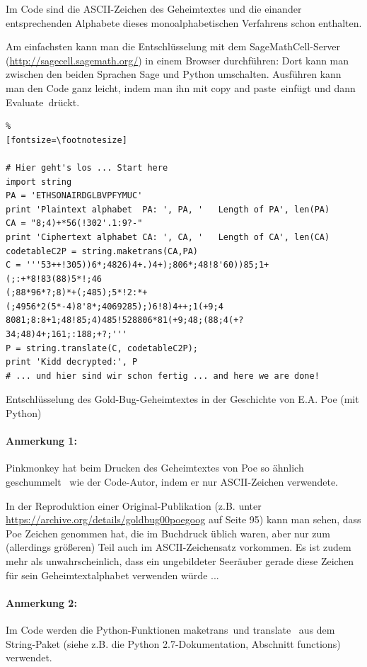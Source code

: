 \begin{refsegment}
Im Code sind die ASCII-Zeichen des Geheimtextes und die einander entsprechenden
Alphabete dieses monoalphabetischen Verfahrens schon enthalten.

Am einfachsten kann man die Entschlüsselung mit dem SageMathCell-Server
(\url{http://sagecell.sagemath.org/}) in einem Browser durchführen:
Dort kann man zwischen den beiden Sprachen Sage und Python umschalten.
Ausführen kann man den Code ganz leicht, indem man ihn mit \glqq copy and
paste\grqq~einfügt und dann \glqq Evaluate\grqq~drückt.\\

\begin{sagecode}
\begin{Verbatim}%
[fontsize=\footnotesize]

# Hier geht's los ... Start here
import string
PA = 'ETHSONAIRDGLBVPFYMUC'
print 'Plaintext alphabet  PA: ', PA, '   Length of PA', len(PA)
CA = "8;4)+*56(!302'.1:9?-"
print 'Ciphertext alphabet CA: ', CA, '   Length of CA', len(CA)
codetableC2P = string.maketrans(CA,PA)
C = '''53++!305))6*;4826)4+.)4+);806*;48!8'60))85;1+(;:+*8!83(88)5*!;46
(;88*96*?;8)*+(;485);5*!2:*+(;4956*2(5*-4)8'8*;4069285);)6!8)4++;1(+9;4
8081;8:8+1;48!85;4)485!528806*81(+9;48;(88;4(+?34;48)4+;161;:188;+?;'''
P = string.translate(C, codetableC2P);
print 'Kidd decrypted:', P
# ... und hier sind wir schon fertig ... and here we are done!

\end{Verbatim}
\caption{Entschlüsselung des Gold-Bug-Geheimtextes in der Geschichte von E.A. Poe (mit Python)}
\label{Lit_Python-sample_Gold-bug}
\end{sagecode}

\paragraph*{Anmerkung 1:}
Pinkmonkey hat beim Drucken des Geheimtextes von Poe so ähnlich \glqq geschummelt\grqq~
wie der Code-Autor, indem er nur ASCII-Zeichen verwendete.

In der Reproduktion einer Original-Publikation (z.B. unter
\url{https://archive.org/details/goldbug00poegoog} auf Seite 95) kann man sehen,
dass Poe Zeichen genommen hat, die im Buchdruck üblich waren, aber nur
zum (allerdings größeren) Teil auch im ASCII-Zeichensatz vorkommen. Es ist zudem
mehr als unwahrscheinlich, dass ein ungebildeter Seeräuber gerade diese
Zeichen für sein Geheimtextalphabet verwenden würde ...


\paragraph*{Anmerkung 2:}
Im Code werden die Python-Funktionen \glqq maketrans\grqq~und \glqq translate\grqq~
aus dem String-Paket (siehe z.B. die Python 2.7-Dokumentation, Abschnitt \glqq functions\grqq)
verwendet.


\end{refsegment}
